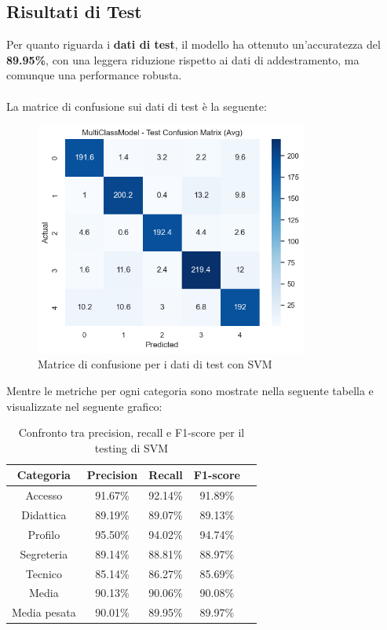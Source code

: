 \newpage

\subsection{Risultati di Test}

Per quanto riguarda i \textbf{dati di test}, il modello ha ottenuto un'accuratezza del \textbf{89.95\%}, con una leggera riduzione rispetto ai dati di addestramento, ma comunque una performance robusta. \\ \\
La matrice di confusione sui dati di test è la seguente:

\begin{figure}[H]
    \centering
    \includegraphics[width=0.8\textwidth]{images/confusion_matrix_test_svm.png}
    \caption{Matrice di confusione per i dati di test con SVM}
    \label{fig:confusion_matrix_test_svm}
\end{figure}

Mentre le metriche per ogni categoria sono mostrate nella seguente tabella e visualizzate nel seguente grafico:

\begin{table}[H]
    \centering
    \begin{tabular}{|c|c|c|c|c|}
        \hline
        \textbf{Categoria} & \textbf{Precision} & \textbf{Recall} & \textbf{F1-score} \\
        \hline
        Accesso & 91.67\% & 92.14\% & 91.89\% \\
        \hline
        Didattica & 89.19\% & 89.07\% & 89.13\% \\
        \hline
        Profilo & 95.50\% & 94.02\% & 94.74\% \\
        \hline
        Segreteria & 89.14\% & 88.81\% & 88.97\% \\
        \hline
        Tecnico & 85.14\% & 86.27\% & 85.69\% \\
        \hline
        Media & 90.13\% & 90.06\% & 90.08\% \\
        \hline
        Media pesata & 90.01\% & 89.95\% & 89.97\% \\
        \hline
    \end{tabular}
    \caption{Confronto tra precision, recall e F1-score per il testing di SVM}
    \label{tab:metriche_svm_test}
\end{table}

